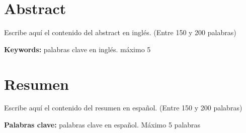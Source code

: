   \clearpage
  \chapter*{Abstract}
  Escribe aquí el contenido del abstract en inglés. (Entre 150 y 200 palabras)

  \vspace{1cm}
  \textbf{Keywords:} palabras clave en inglés. máximo 5

  \clearpage
  \chapter*{Resumen}
  Escribe aquí el contenido del resumen en español. (Entre 150 y 200 palabras)

  \vspace{1cm}
  \textbf{Palabras clave:} palabras clave en español. Máximo 5 palabras